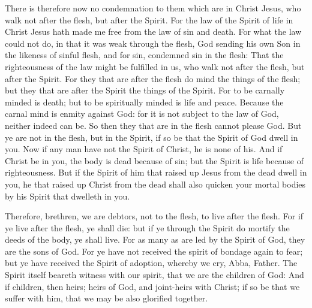  There is therefore now no condemnation to them which are in
Christ Jesus, who walk not after the flesh, but after the Spirit.
 For the law of the Spirit of life in Christ Jesus hath made
me free from the law of sin and death.  For what the law
could not do, in that it was weak through the flesh, God sending his own
Son in the likeness of sinful flesh, and for sin, condemned sin in the
flesh:  That the righteousness of the law might be fulfilled
in us, who walk not after the flesh, but after the Spirit. 
For they that are after the flesh do mind the things of the flesh; but
they that are after the Spirit the things of the Spirit. 
For to be carnally minded is death; but to be spiritually minded is life
and peace.  Because the carnal mind is enmity against God:
for it is not subject to the law of God, neither indeed can be.
 So then they that are in the flesh cannot please God.
 But ye are not in the flesh, but in the Spirit, if so be
that the Spirit of God dwell in you. Now if any man have not the Spirit
of Christ, he is none of his.  And if Christ be in you, the
body is dead because of sin; but the Spirit is life because of
righteousness.  But if the Spirit of him that raised up
Jesus from the dead dwell in you, he that raised up Christ from the dead
shall also quicken your mortal bodies by his Spirit that dwelleth in
you.

 Therefore, brethren, we are debtors, not to the flesh, to
live after the flesh.  For if ye live after the flesh, ye
shall die: but if ye through the Spirit do mortify the deeds of the
body, ye shall live.  For as many as are led by the Spirit
of God, they are the sons of God.  For ye have not received
the spirit of bondage again to fear; but ye have received the Spirit of
adoption, whereby we cry, Abba, Father.  The Spirit itself
beareth witness with our spirit, that we are the children of God:
 And if children, then heirs; heirs of God, and joint-heirs
with Christ; if so be that we suffer with him, that we may be also
glorified together.

